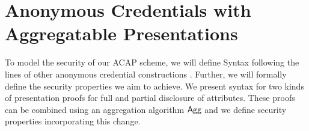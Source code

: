 \section{Anonymous Credentials with Aggregatable Presentations} \label{sec:acap}
To model the security of our ACAP scheme, we will define Syntax following the lines of other anonymous credential constructions \cite{DBLP:conf/eurocrypt/TessaroZ23a}. Further, we will formally define the security properties we aim to achieve. We present syntax for two kinds of presentation proofs for full and partial disclosure of attributes. These proofs can be combined using an aggregation algorithm $\mathsf{Agg}$ and we define security properties incorporating this change.

